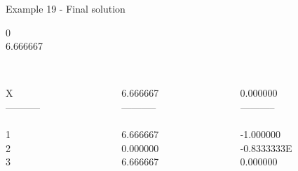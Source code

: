 \begin{frame}{Example 19 - Final solution}

  0\\
  6.666667\\

\begin{columns}[t]
\begin{column}{0.3\textwidth}
\\
X\\
-----------\\
\\
1\\
2\\
3\\

\end{column}
\begin{column}{0.3\textwidth}
\\
6.666667\\

-----------\\
\\
6.666667\\
0.000000\\
6.666667\\

\end{column}  

\begin{column}{0.3\textwidth}
\\
0.000000\\

-----------\\
\\
-1.000000\\
-0.8333333E\\
0.000000\\
\end{column}
\end{columns}
\end{frame}
